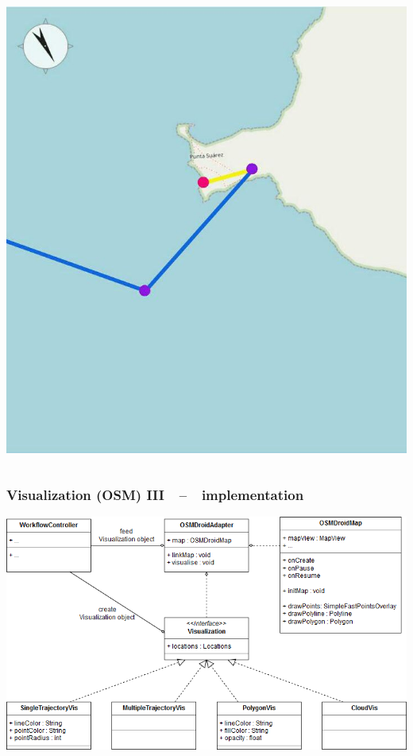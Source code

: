 \documentclass[xcolor=dvipsnames]{beamer}
\begin{document}
\begin{frame}
\begin{columns}
\begin{column}{0.56\textwidth}
		\includegraphics[width=\textwidth]{screenshots/vis-functional-2.jpg}
	\end{column}
	\end{columns}
\end{frame}


\begin{frame}
	\frametitle{\textbf{Visualization (OSM) III}~~--~~implementation}
		\includegraphics[width=\textwidth]{diagrams/ClassDiagram_OSM.png}
\end{frame}
\end{document}
